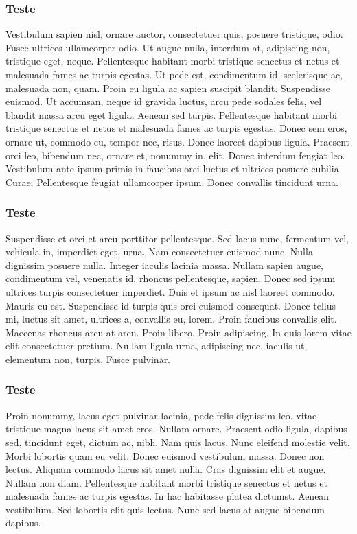 \subsubsection{Teste}
Vestibulum sapien nisl, ornare auctor, consectetuer quis, posuere tristique, odio. Fusce ultrices ullamcorper odio. Ut augue nulla, interdum at, adipiscing non, tristique eget, neque. Pellentesque habitant morbi tristique senectus et netus et malesuada fames ac turpis egestas. Ut pede est, condimentum id, scelerisque ac, malesuada non, quam. Proin eu ligula ac sapien suscipit blandit. Suspendisse euismod. Ut accumsan, neque id gravida luctus, arcu pede sodales felis, vel blandit massa arcu eget ligula. Aenean sed turpis. Pellentesque habitant morbi tristique senectus et netus et malesuada fames ac turpis egestas. Donec sem eros, ornare ut, commodo eu, tempor nec, risus. Donec laoreet dapibus ligula. Praesent orci leo, bibendum nec, ornare et, nonummy in, elit. Donec interdum feugiat leo. Vestibulum ante ipsum primis in faucibus orci luctus et ultrices posuere cubilia Curae; Pellentesque feugiat ullamcorper ipsum. Donec convallis tincidunt urna.
\subsubsection{Teste}
Suspendisse et orci et arcu porttitor pellentesque. Sed lacus nunc, fermentum vel, vehicula in, imperdiet eget, urna. Nam consectetuer euismod nunc. Nulla dignissim posuere nulla. Integer iaculis lacinia massa. Nullam sapien augue, condimentum vel, venenatis id, rhoncus pellentesque, sapien. Donec sed ipsum ultrices turpis consectetuer imperdiet. Duis et ipsum ac nisl laoreet commodo. Mauris eu est. Suspendisse id turpis quis orci euismod consequat. Donec tellus mi, luctus sit amet, ultrices a, convallis eu, lorem. Proin faucibus convallis elit. Maecenas rhoncus arcu at arcu. Proin libero. Proin adipiscing. In quis lorem vitae elit consectetuer pretium. Nullam ligula urna, adipiscing nec, iaculis ut, elementum non, turpis. Fusce pulvinar.
\subsubsection{Teste}
Proin nonummy, lacus eget pulvinar lacinia, pede felis dignissim leo, vitae tristique magna lacus sit amet eros. Nullam ornare. Praesent odio ligula, dapibus sed, tincidunt eget, dictum ac, nibh. Nam quis lacus. Nunc eleifend molestie velit. Morbi lobortis quam eu velit. Donec euismod vestibulum massa. Donec non lectus. Aliquam commodo lacus sit amet nulla. Cras dignissim elit et augue. Nullam non diam. Pellentesque habitant morbi tristique senectus et netus et malesuada fames ac turpis egestas. In hac habitasse platea dictumst. Aenean vestibulum. Sed lobortis elit quis lectus. Nunc sed lacus at augue bibendum dapibus.

